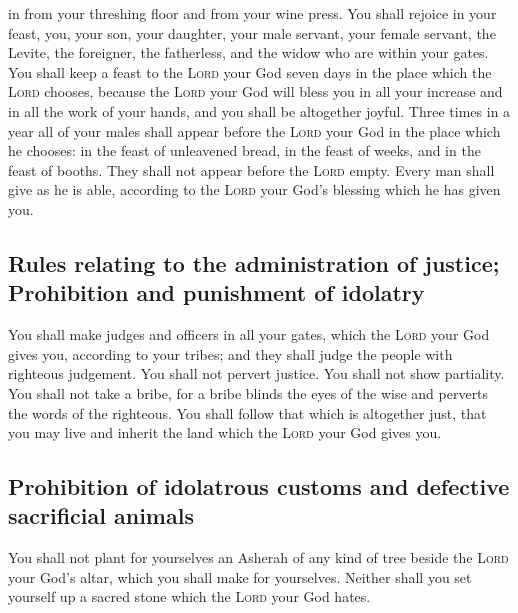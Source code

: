 in from your threshing floor and from your wine press. 
You shall rejoice in your feast, you, your son, your daughter, your male
servant, your female servant, the Levite, the foreigner, the fatherless,
and the widow who are within your gates.  You shall keep
a feast to the \textsc{Lord} your God seven days in the place which the
\textsc{Lord} chooses, because the \textsc{Lord} your God will bless you
in all your increase and in all the work of your hands, and you shall be
altogether joyful.  Three times in a year all of your
males shall appear before the \textsc{Lord} your God in the place which
he chooses: in the feast of unleavened bread, in the feast of weeks, and
in the feast of booths. They shall not appear before the \textsc{Lord}
empty.  Every man shall give as he is able, according to
the \textsc{Lord} your God's blessing which he has given you.

\hypertarget{rules-relating-to-the-administration-of-justice-prohibition-and-punishment-of-idolatry}{%
\subsection{Rules relating to the administration of justice; Prohibition
and punishment of
idolatry}\label{rules-relating-to-the-administration-of-justice-prohibition-and-punishment-of-idolatry}}

 You shall make judges and officers in all your gates,
which the \textsc{Lord} your God gives you, according to your tribes;
and they shall judge the people with righteous judgement.
 You shall not pervert justice. You shall not show
partiality. You shall not take a bribe, for a bribe blinds the eyes of
the wise and perverts the words of the righteous.  You
shall follow that which is altogether just, that you may live and
inherit the land which the \textsc{Lord} your God gives you.

\hypertarget{prohibition-of-idolatrous-customs-and-defective-sacrificial-animals}{%
\subsection{Prohibition of idolatrous customs and defective sacrificial
animals}\label{prohibition-of-idolatrous-customs-and-defective-sacrificial-animals}}

 You shall not plant for yourselves an Asherah of any
kind of tree beside the \textsc{Lord} your God's altar, which you shall
make for yourselves.  Neither shall you set yourself up a
sacred stone which the \textsc{Lord} your God hates.

